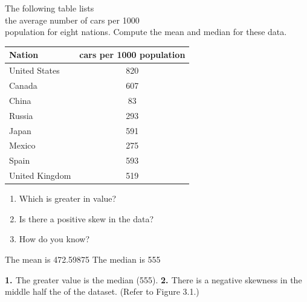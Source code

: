 \documentclass[11pt, chapterprefix=true]{scrbook}\usepackage[]{graphicx}\usepackage[]{color}
\begin{document}
\begin{exercises}
\begin{solution}
	\end{solution}

  \begin{exercise} %

    The following table lists \\ the average number of cars per 1000 \\ population for eight nations. Compute the mean and median for these data.

  {\small{
   \begin{tabular}{@{} lc @{}} \hline  %
   Nation & cars per 1000 population \\ \hline
   United States & 820 \\
   Canada & 607 \\
   China & 83 \\
   Russia & 293 \\
   Japan & 591 \\
   Mexico & 275 \\
   Spain & 593 \\
   United Kingdom & 519 \\ \hline
   \end{tabular}
  }}


  \begin{enumerate}
  \item Which is greater in value?
  \item Is there a positive skew in the data?
  \item How do you know?
  \end{enumerate}

  \end{exercise}
  \begin{solution}   %




    The mean is 472.59875
    The median is 555

{\bf{1. }} The greater value is the median (555).  {\bf{2. }} There is a negative skewness in the middle half the of the dataset.  (Refer to Figure 3.1.)


\end{solution}
\end{exercises}
\end{document}
